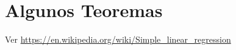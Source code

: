 \documentclass[letterpaper,11pt]{report}
\begin{document}
%
%
%
%
%
%
%
%
%
%
%
%
%
%
\section{Algunos Teoremas}

Ver \url{https://en.wikipedia.org/wiki/Simple_linear_regression}
\end{document}
